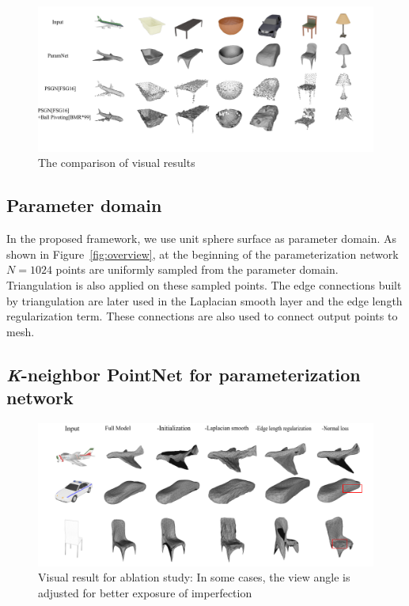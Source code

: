 \begin{figure}[htbp]
	\centering
	\includegraphics[width=\linewidth]{img/res/res}
	\caption{The comparison of visual results}
	\label{fig:res}
\end{figure}

\subsection{Parameter domain}
In the proposed framework, we use unit sphere surface as parameter domain. As shown in Figure~\ref{fig:overview}, at the beginning of the parameterization network $N=1024$ points are uniformly sampled from the parameter domain. Triangulation is also applied on these sampled points. The edge connections built by triangulation are later used in the Laplacian smooth layer and the edge length regularization term. These connections are also used to connect output points to mesh.
\subsection{\textit{K}-neighbor PointNet for parameterization network} 
\label{subsec:k-n_point_net}

\begin{figure}[htbp]
	\centering
	\includegraphics[width=\linewidth]{img/abl/abl}
	\caption{Visual result for ablation study: In some cases, the view angle is adjusted for better exposure of imperfection}
	\label{fig:abl}
\end{figure}

